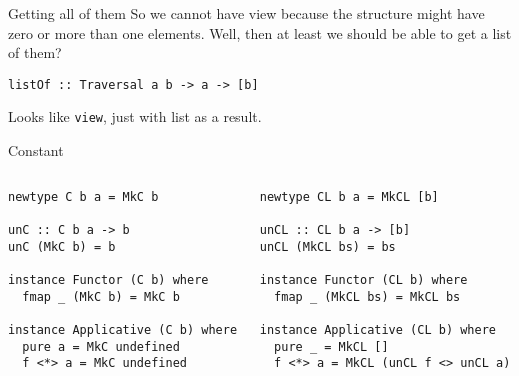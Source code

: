 \documentclass[presentation,aspectratio=169,8pt]{beamer}
\begin{document}
\begin{frame}[label={sec:org6340940},fragile]{Getting all of them}
 So we cannot have view because the structure might have zero or more than one
elements. Well, then at least we should be able to get a list of them?

\begin{verbatim}
listOf :: Traversal a b -> a -> [b]
\end{verbatim}

\pause

Looks like \texttt{view}, just with list as a result.
\end{frame}

\begin{frame}[label={sec:orgf543b1b},fragile]{Constant}
 \begin{columns}
\begin{column}{0.5\columnwidth}
\begin{verbatim}
newtype C b a = MkC b

unC :: C b a -> b
unC (MkC b) = b

instance Functor (C b) where
  fmap _ (MkC b) = MkC b

instance Applicative (C b) where
  pure a = MkC undefined
  f <*> a = MkC undefined
\end{verbatim}
\end{column}

\begin{column}{0.5\columnwidth}
\begin{verbatim}
newtype CL b a = MkCL [b]

unCL :: CL b a -> [b]
unCL (MkCL bs) = bs

instance Functor (CL b) where
  fmap _ (MkCL bs) = MkCL bs

instance Applicative (CL b) where
  pure _ = MkCL []
  f <*> a = MkCL (unCL f <> unCL a)
\end{verbatim}
\end{column}
\end{columns}
\end{frame}
\end{document}
